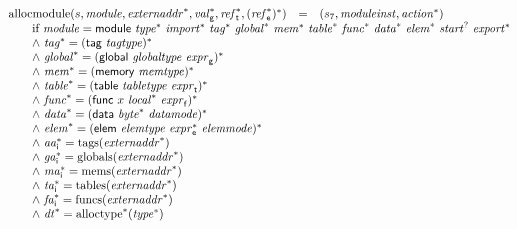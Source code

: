 $$
\begin{array}[t]{@{}lcl@{}l@{}}
{\mathrm{allocmodule}}(s, {\mathit{module}}, {{\mathit{externaddr}}^\ast}, {{\mathit{val}}_{\mathsf{g}}^\ast}, {{\mathit{ref}}_{\mathsf{t}}^\ast}, {({{\mathit{ref}}_{\mathsf{e}}^\ast})^\ast}) & = & (s_7, {\mathit{moduleinst}}, {{\mathit{action}}^\ast}) &  \\
 \multicolumn{4}{@{}l@{}}{\quad
\quad
\begin{array}[t]{@{}l@{}}
\mbox{if}~ {\mathit{module}} = \mathsf{module}~{{\mathit{type}}^\ast}~{{\mathit{import}}^\ast}~{{\mathit{tag}}^\ast}~{{\mathit{global}}^\ast}~{{\mathit{mem}}^\ast}~{{\mathit{table}}^\ast}~{{\mathit{func}}^\ast}~{{\mathit{data}}^\ast}~{{\mathit{elem}}^\ast}~{{\mathit{start}}^?}~{{\mathit{export}}^\ast} \\
{\land}~ {{\mathit{tag}}^\ast} = {(\mathsf{tag}~{\mathit{tagtype}})^\ast} \\
{\land}~ {{\mathit{global}}^\ast} = {(\mathsf{global}~{\mathit{globaltype}}~{\mathit{expr}}_{\mathsf{g}})^\ast} \\
{\land}~ {{\mathit{mem}}^\ast} = {(\mathsf{memory}~{\mathit{memtype}})^\ast} \\
{\land}~ {{\mathit{table}}^\ast} = {(\mathsf{table}~{\mathit{tabletype}}~{\mathit{expr}}_{\mathsf{t}})^\ast} \\
{\land}~ {{\mathit{func}}^\ast} = {(\mathsf{func}~x~{{\mathit{local}}^\ast}~{\mathit{expr}}_{\mathsf{f}})^\ast} \\
{\land}~ {{\mathit{data}}^\ast} = {(\mathsf{data}~{{\mathit{byte}}^\ast}~{\mathit{datamode}})^\ast} \\
{\land}~ {{\mathit{elem}}^\ast} = {(\mathsf{elem}~{\mathit{elemtype}}~{{\mathit{expr}}_{\mathsf{e}}^\ast}~{\mathit{elemmode}})^\ast} \\
{\land}~ {{\mathit{aa}}_{\mathsf{i}}^\ast} = {\mathrm{tags}}({{\mathit{externaddr}}^\ast}) \\
{\land}~ {{\mathit{ga}}_{\mathsf{i}}^\ast} = {\mathrm{globals}}({{\mathit{externaddr}}^\ast}) \\
{\land}~ {{\mathit{ma}}_{\mathsf{i}}^\ast} = {\mathrm{mems}}({{\mathit{externaddr}}^\ast}) \\
{\land}~ {{\mathit{ta}}_{\mathsf{i}}^\ast} = {\mathrm{tables}}({{\mathit{externaddr}}^\ast}) \\
{\land}~ {{\mathit{fa}}_{\mathsf{i}}^\ast} = {\mathrm{funcs}}({{\mathit{externaddr}}^\ast}) \\
{\land}~ {{\mathit{dt}}^\ast} = {{{\mathrm{alloctype}}^\ast}}{({{\mathit{type}}^\ast})} \\

\end{array}}
\end{array}$$

